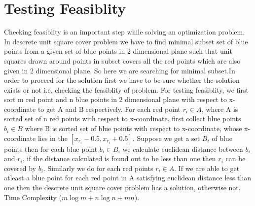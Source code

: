 \documentclass[10pt,a4wide]{report}
\theoremstyle{plain}
\theoremstyle{definition}
\theoremstyle{remark}
\begin{document}
\chapter{Testing Feasiblity}Checking feasiblity is an important step while solving an optimization problem. In descrete unit square cover problem
                            we have to find minimal subset set of blue points from a given set of blue points in 2 dimensional plane such that unit
                            squares drawn around points in subset covers all the red points which are also given in 2 dimensional plane. So here 
                            we are searching for minimal subset.In order to proceed for the solution first we have to be sure whether the solution 
                            exists or not i.e, checking the feasiblity of problem. For testing feasiblity, we first sort m red point and n blue points in 2 
                            dimensional plane with respect to x-coordinate to get A and B respectively. For each red point $r_{i} \in A$, where A 
                            is sorted set of n red points with respect to x-coordinate, first collect blue points $b_{i} \in B$ where B is sorted
                            set of blue points with respect to x-coordinate, whose x-coordinate lies in the $[x_{r_{i}}-0.5,x_{r_{i}}+0.5]$. Suppose 
                            we get a set $B_{i}$ of blue points then for each blue point $b_{i} \in B_{i}$
                            we calculate euclidean distance between $b_{i}$and $r_{i}$, if the distance calculated is found out to be less than one
                            then $r_{i}$ can be covered by $b_{i}$. Similarly we do for each red points $r_{i} \in A$. If we are able to get 
                            atleast a blue point for each red point in A satisfying euclidean distance less than one then the descrete unit 
                            square cover problem has a solution, otherwise not. Time Complexity ($m\log m+ n\log n + mn$).
 
\end{document}
